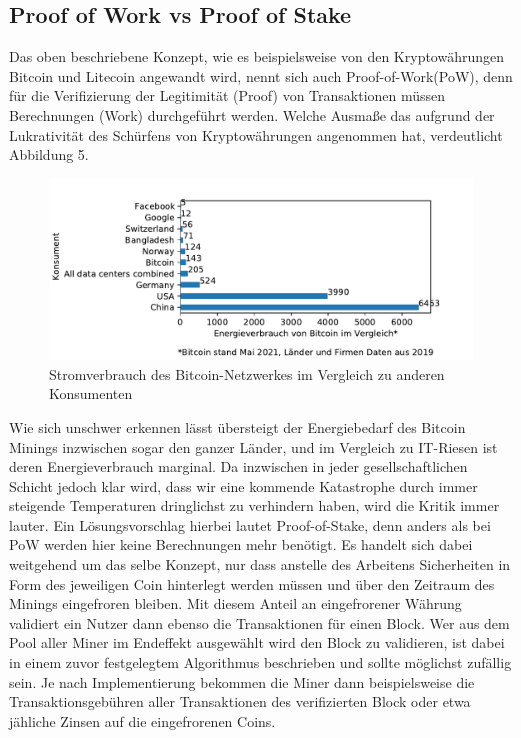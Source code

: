 \documentclass[12pt,oneside]{article}
\begin{document}
\subsection{Proof of Work vs Proof of Stake}
Das oben beschriebene Konzept, wie es beispielsweise von den Kryptowährungen Bitcoin und Litecoin angewandt wird, nennt sich auch \glqq Proof-of-Work\grqq (PoW), denn für die Verifizierung der Legitimität (Proof) von Transaktionen müssen Berechnungen (Work) durchgeführt werden. Welche Ausmaße das aufgrund der Lukrativität des Schürfens von Kryptowährungen angenommen hat, verdeutlicht Abbildung 5.
\begin{figure}[h]
\centering
\includegraphics[scale=0.7]{./images/energyconsume.pdf}
\caption{Stromverbrauch des Bitcoin-Netzwerkes im Vergleich zu anderen Konsumenten \cite{statista2021}}
\centering
\end{figure}

Wie sich unschwer erkennen lässt übersteigt der Energiebedarf des Bitcoin Minings inzwischen sogar den ganzer Länder, und im Vergleich zu IT-Riesen ist deren Energieverbrauch marginal. Da inzwischen in jeder gesellschaftlichen Schicht jedoch klar wird, dass wir eine kommende Katastrophe durch immer steigende Temperaturen dringlichst zu verhindern haben, wird die Kritik immer lauter. Ein Lösungsvorschlag hierbei lautet Proof-of-Stake, denn anders als bei PoW werden hier keine Berechnungen mehr benötigt. Es handelt sich dabei weitgehend um das selbe Konzept, nur dass anstelle des Arbeitens Sicherheiten in Form des jeweiligen Coin hinterlegt werden müssen und über den Zeitraum des Minings eingefroren bleiben. Mit diesem Anteil an eingefrorener Währung validiert ein Nutzer dann ebenso die Transaktionen für einen Block. Wer aus dem Pool aller Miner im Endeffekt ausgewählt wird den Block zu validieren, ist dabei in einem zuvor festgelegtem Algorithmus beschrieben und sollte möglichst zufällig sein. Je nach Implementierung bekommen die Miner dann beispielsweise die Transaktionsgebühren aller Transaktionen des verifizierten Block oder etwa jähliche Zinsen auf die eingefrorenen Coins. \cite{soeteman2019}
\end{document}
